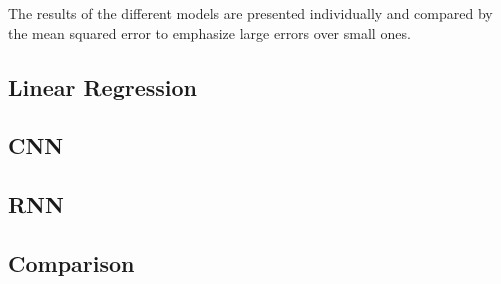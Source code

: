 
The results of the different models are presented individually and compared by the mean squared error to emphasize 
large errors over small ones.

\subsection{Linear Regression}
\subsection{CNN}
\subsection{RNN}
\subsection{Comparison}
